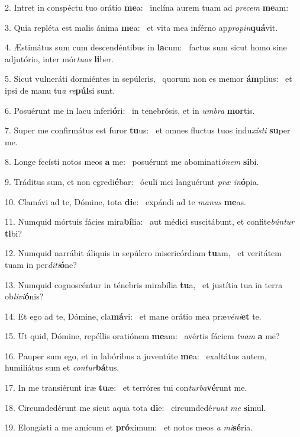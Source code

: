 2. Intret in conspéctu tuo orátio \textbf{me}a: \ast\  inclína aurem tuam ad \textit{pre}\textit{cem} \textbf{me}am:\

3. Quia repléta est malis ánima \textbf{me}a: \ast\  et vita mea inférno ap\textit{pro}\textit{pin}\textbf{quá}vit.\

4. Æstimátus sum cum descendéntibus in \textbf{la}cum: \ast\  factus sum sicut homo sine adjutório, inter mór\textit{tu}\textit{os} \textbf{li}ber.\

5. Sicut vulneráti dormiéntes in sepúlcris, \dag\  quorum non es memor \textbf{ám}plius: \ast\  et ipsi de manu tu\textit{a} \textit{re}\textbf{púl}si sunt.\

6. Posuérunt me in lacu inferi\textbf{ó}ri: \ast\  in tenebrósis, et in \textit{um}\textit{bra} \textbf{mor}tis.\

7. Super me confirmátus est furor \textbf{tu}us: \ast\  et omnes fluctus tuos indu\textit{xís}\textit{ti} \textbf{su}per me.\

8. Longe fecísti notos meos \textbf{a} me: \ast\  posuérunt me abominati\textit{ó}\textit{nem} \textbf{si}bi.\

9. Tráditus sum, et non egredi\textbf{é}bar: \ast\  óculi mei languérunt \textit{præ} \textit{in}\textbf{ó}pia.\

10. Clamávi ad te, Dómine, tota \textbf{di}e: \ast\  expándi ad te \textit{ma}\textit{nus} \textbf{me}as.\

11. Numquid mórtuis fácies mira\textbf{bí}lia: \ast\  aut médici suscitábunt, et confite\textit{bún}\textit{tur} \textbf{ti}bi?\

12. Numquid narrábit áliquis in sepúlcro misericórdiam \textbf{tu}am, \ast\  et veritátem tuam in per\textit{di}\textit{ti}\textbf{ó}ne?\

13. Numquid cognoscéntur in ténebris mirabília \textbf{tu}a, \ast\  et justítia tua in terra ob\textit{li}\textit{vi}\textbf{ó}nis?\

14. Et ego ad te, Dómine, cla\textbf{má}vi: \ast\  et mane orátio mea præ\textit{vé}\textit{ni}\textbf{et} te.\

15. Ut quid, Dómine, repéllis oratiónem \textbf{me}am: \ast\  avértis fáciem \textit{tu}\textit{am} \textbf{a} me?\

16. Pauper sum ego, et in labóribus a juventúte \textbf{me}a: \ast\  exaltátus autem, humiliátus sum et \textit{con}\textit{tur}\textbf{bá}tus.\

17. In me transiérunt iræ \textbf{tu}æ: \ast\  et terróres tui con\textit{tur}\textit{ba}\textbf{vé}runt me.\

18. Circumdedérunt me sicut aqua tota \textbf{di}e: \ast\  circumdedé\textit{runt} \textit{me} \textbf{si}mul.\

19. Elongásti a me amícum et \textbf{pró}ximum: \ast\  et notos meos \textit{a} \textit{mi}\textbf{sé}ria.\

